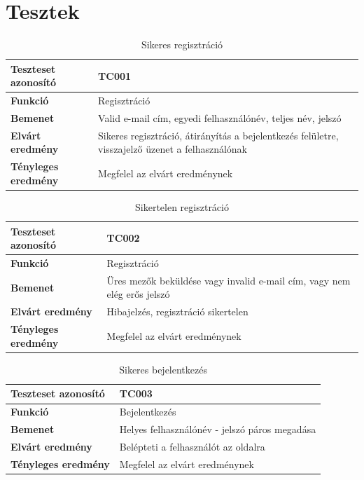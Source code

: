 \section{Tesztek}
\begin{table}[h!]
	\centering
	\begin{tabular}{|l|p{10cm}|}
		\hline
		\textbf{Teszteset azonosító} & TC001 \\ \hline
		\textbf{Funkció} & Regisztráció \\ \hline
		\textbf{Bemenet} & Valid e-mail cím, egyedi felhasználónév, teljes név, jelszó \\ \hline
		\textbf{Elvárt eredmény} & Sikeres regisztráció, átirányítás a bejelentkezés felületre, visszajelző üzenet a felhasználónak \\ \hline
		\textbf{Tényleges eredmény} & Megfelel az elvárt eredménynek\\ \hline
	\end{tabular}
	\caption{Sikeres regisztráció}
	\label{tab:manual_testcase_registration}
\end{table}
\begin{table}[h!]
	\centering
	\begin{tabular}{|l|p{10cm}|}
		\hline
		\textbf{Teszteset azonosító} & TC002 \\ \hline
		\textbf{Funkció} & Regisztráció \\ \hline
		\textbf{Bemenet} & Üres mezők beküldése vagy invalid e-mail cím, vagy nem elég erős jelszó \\ \hline
		\textbf{Elvárt eredmény} & Hibajelzés, regisztráció sikertelen \\ \hline
		\textbf{Tényleges eredmény} & Megfelel az elvárt eredménynek \\ \hline
	\end{tabular}
	\caption{Sikertelen regisztráció}
	\label{tab:regisztracio_ures}
\end{table}

\begin{table}[h!]
	\centering
	\begin{tabular}{|l|p{10cm}|}
		\hline
		\textbf{Teszteset azonosító} & TC003 \\ \hline
		\textbf{Funkció} & Bejelentkezés \\ \hline
		\textbf{Bemenet} & Helyes felhasználónév - jelszó páros megadása \\ \hline
		\textbf{Elvárt eredmény} & Belépteti a felhasználót az oldalra \\ \hline
		\textbf{Tényleges eredmény} & Megfelel az elvárt eredménynek \\ \hline
	\end{tabular}
	\caption{Sikeres bejelentkezés}
	\label{tab:bejelentkezes_hibas_adatokkal}
\end{table}

